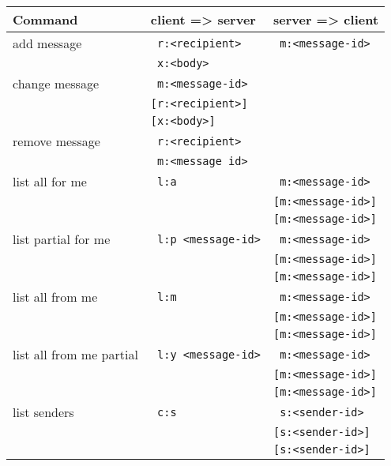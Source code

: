 \documentclass[twoside,a4paper,english,12pt,authoryear,openright]{book}
\begin{document}
\begin{table}[htdp]
\begin{center}
\begin{tabular}{ | l | l | l |  }

\hline
Command & client => server & server => client  \\
\hline

add message  & \texttt{ r:<recipient>}  & \texttt{ m:<message-id>}  \\
& \texttt{ x:<body>}  &  \\
\hline

change message  & \texttt{ m:<message-id>}  &  \\
& \texttt{[r:<recipient>]}  &  \\
& \texttt{[x:<body>]}  &  \\
\hline

remove message  & \texttt{ r:<recipient>}  &  \\
& \texttt{ m:<message id>} &\\
\hline

list all for me  & \texttt{ l:a}  & \texttt{ m:<message-id>}  \\
&& \texttt{[m:<message-id>]}  \\
&& \texttt{[m:<message-id>]}  \\
\hline

list partial for me  & \texttt{ l:p <message-id>}  & \texttt{ m:<message-id>}  \\
&& \texttt{[m:<message-id>]}  \\
&& \texttt{[m:<message-id>]}  \\
\hline

list all from me  & \texttt{ l:m}  & \texttt{ m:<message-id>}  \\
&& \texttt{[m:<message-id>]}  \\
&& \texttt{[m:<message-id>]}  \\
\hline

list all from me partial  & \texttt{ l:y <message-id>}  & \texttt{ m:<message-id>}  \\
&& \texttt{[m:<message-id>]}  \\
&& \texttt{[m:<message-id>]}  \\
\hline

list senders  & \texttt{ c:s}  & \texttt{ s:<sender-id>}  \\
&& \texttt{[s:<sender-id>]}  \\
&& \texttt{[s:<sender-id>]}  \\
\hline


\end{tabular}
\end{center}
\end{table}
\end{document}
